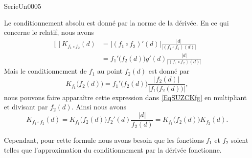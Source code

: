
\begin{corrige}{SerieUn0005}

	Le conditionnement absolu est donné par la norme de la dérivée. En ce qui concerne le  relatif, nous avons 
	\begin{equation}		\label{EqSUZCKfg}
		\begin{aligned}[]
			K_{f_1\circ f_2}(d)&=| (f_1\circ f_2)'(d) |\frac{ | d | }{ | (f_1\circ f_2)(d) | }\\
			&=f_1'\big( f_2(d) \big)g'(d)\frac{ | d | }{ | (f_1\circ f_2)(d) | }
		\end{aligned}
	\end{equation}
	Mais le conditionnement de $f_1$ au point $f_2(d)$ est donné par
	\begin{equation}
		K_{f_1}\big( f_2(d) \big)=f_1'\big( f_2(d) \big)\frac{ | f_2(d) | }{ | f_1\big( f_2(d) \big) | },
	\end{equation}
	nous pouvons faire apparaître cette expression dans \eqref{EqSUZCKfg} en multipliant et divisant par $f_2(d)$. Ainsi nous avons
	\begin{equation}
		K_{f_1\circ f_2}(d)=K_{f_1}\big( f_2(d) \big)f_2'(d)\frac{ | d | }{ f_2(d) }=K_{f_1}\big( f_2(d) \big)K_{f_2}(d).
	\end{equation}
	
	Cependant, pour cette formule nous avons besoin que les fonctions $f_1$ et $f_2$ soient telles que l'approximation du conditionnement par la dérivée fonctionne.

\end{corrige}
